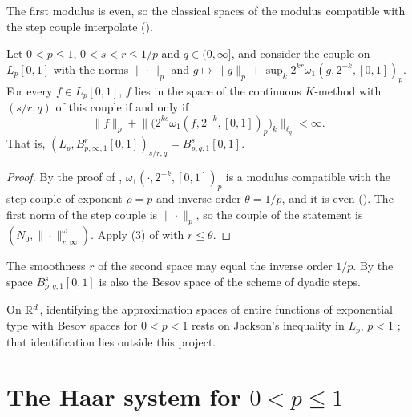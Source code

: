 The first modulus is even, so the classical spaces of the modulus compatible with the step
couple interpolate ().

\begin{corollary}
\label{cor:steps-interpolate-below-one}
\leanok
{}
Let $0 < p \leq 1$, $0 < s < r \leq 1/p$ and $q \in (0, \infty]$, and consider the couple on
$L_p[0, 1]$ with the norms $\|\cdot\|_p$ and
$g \mapsto \|g\|_p + \sup_k 2^{kr} \omega_1(g, 2^{-k}, [0, 1])_p$. For every $f \in L_p[0, 1]$,
$f$ lies in the space of the continuous $K$-method with $(s/r, q)$ of this couple if and only if
\[
  \|f\|_p + \bigl\| \bigl( 2^{ks} \omega_1(f, 2^{-k}, [0, 1])_p \bigr)_k \bigr\|_{\ell_q}
  < \infty .
\]
That is, $(L_p, B^r_{p,\infty,1}[0, 1])_{s/r, q} = B^s_{p,q,1}[0, 1]$.
\end{corollary}

\begin{proof}
\leanok
{}
By the proof of , $\omega_1(\cdot, 2^{-k}, [0, 1])_p$ is a
modulus compatible with the step couple of exponent $\rho = p$ and inverse order
$\theta = 1/p$, and it is even (). The first norm of the step
couple is $\|\cdot\|_p$, so the couple of the statement is $(N_0, \|\cdot\|^{\omega}_{r, \infty})$.
Apply (3) of  with $r \leq \theta$.
\end{proof}

The smoothness $r$ of the second space may equal the inverse order $1/p$. By
 the space $B^s_{p,q,1}[0, 1]$ is also the Besov space of the scheme
of dyadic steps.

On $\mathbb{R}^d$, identifying the approximation spaces of entire functions of exponential type with Besov
spaces for $0 < p < 1$ rests on Jackson's inequality in $L_p$, $p < 1$
\cite{StorozhenkoOswald1978, KolomoitsevTikhonov2020}; that identification lies outside this
project.

\section{The Haar system for \texorpdfstring{$0 < p \leq 1$}{0 < p <= 1}}
\label{sec:haar-below-one}

